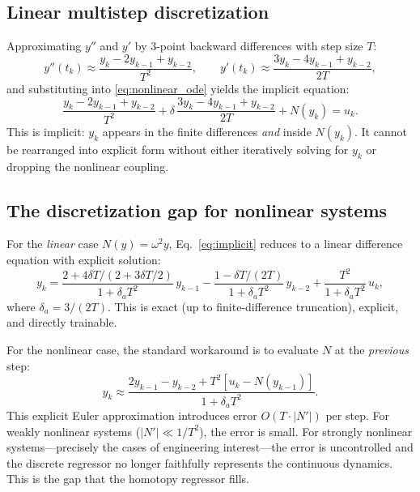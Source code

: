 \documentclass[preprint,12pt]{elsarticle}
\begin{document}
\subsection{Linear multistep discretization}
\label{sec:lmm}
Approximating $y''$ and $y'$ by 3-point backward differences with step size $T$:
\begin{equation}
y''(t_k) \approx \frac{y_k - 2y_{k-1} + y_{k-2}}{T^2}, \qquad
y'(t_k) \approx \frac{3y_k - 4y_{k-1} + y_{k-2}}{2T},
\label{eq:finite_diff}
\end{equation}
and substituting into \eqref{eq:nonlinear_ode} yields the implicit equation:
\begin{equation}
\frac{y_k - 2y_{k-1} + y_{k-2}}{T^2} + \delta\,\frac{3y_k - 4y_{k-1} + y_{k-2}}{2T} + N(y_k) = u_k.
\label{eq:implicit}
\end{equation}
This is implicit: $y_k$ appears in the finite differences \emph{and} inside $N(y_k)$. It cannot be rearranged into explicit form without either iteratively solving for $y_k$ or dropping the nonlinear coupling.

\subsection{The discretization gap for nonlinear systems}
For the \emph{linear} case $N(y) = \omega^2 y$, Eq.~\eqref{eq:implicit} reduces to a linear difference equation with explicit solution:
\begin{equation}
y_k = \frac{2 + 4\delta T/(2+3\delta T/2)}{1+\delta_a T^2}\, y_{k-1} - \frac{1-\delta T/(2T)}{1+\delta_a T^2}\, y_{k-2} + \frac{T^2}{1+\delta_a T^2}\, u_k,
\label{eq:linear_regressor}
\end{equation}
where $\delta_a = 3/(2T)$. This is exact (up to finite-difference truncation), explicit, and directly trainable.

For the nonlinear case, the standard workaround is to evaluate $N$ at the \emph{previous} step:
\begin{equation}
y_k \approx \frac{2y_{k-1} - y_{k-2} + T^2[u_k - N(y_{k-1})]}{1 + \delta_a T^2}.
\label{eq:naive}
\end{equation}
This explicit Euler approximation introduces error $O(T\cdot|N'|)$ per step. For weakly nonlinear systems ($|N'| \ll 1/T^2$), the error is small. For strongly nonlinear systems---precisely the cases of engineering interest---the error is uncontrolled and the discrete regressor no longer faithfully represents the continuous dynamics. This is the gap that the homotopy regressor fills.
\end{document}
